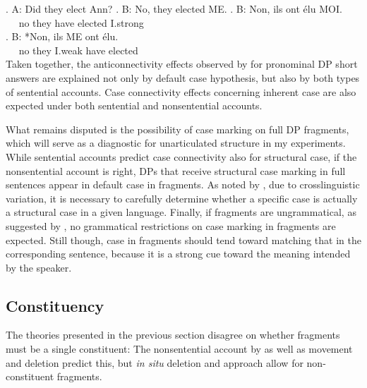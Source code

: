 \ex. A: Did they elect Ann?
\a. B: No, they elected ME.
\bg.  B: Non, ils ont élu MOI.\\
~~ no they have elected I.strong\\
\cg. B: *Non, ils ME ont élu.\\ 
~~ no they I.weak have elected\\

\noindent Taken together, the anticonnectivity effects observed by \citet{barton.progovac2005} for pronominal DP short answers are explained not only by  default case hypothesis, but also by both types of sentential accounts. Case connectivity effects concerning inherent case are also expected under both sentential and nonsentential accounts. \largerpage[-1]

What remains disputed is the possibility of case marking on full DP fragments, which will serve as a diagnostic for unarticulated structure in my experiments. While sentential accounts predict case connectivity also for structural case, if the nonsentential account is right, DPs that receive structural case marking in full sentences appear in default case in fragments. As noted by \citet{progovac.etal2006}, due to crosslinguistic variation, it is necessary to carefully determine whether a specific case is actually a structural case in a given language. Finally, if fragments are ungrammatical, as suggested by \citet{bergen.goodman2015}, no grammatical restrictions on case marking in fragments are expected. Still though, case in fragments should tend toward matching that in the corresponding sentence, because it is a strong cue toward the meaning intended by the speaker.

\subsection{Constituency}\label{sec:theories-predictions-constituents}
The theories presented in the previous section disagree on whether fragments must be a single constituent: The nonsentential account by \citet{barton.progovac2005} as well as movement and deletion predict this, but \textit{in situ} deletion and  approach allow for non-constituent fragments. 

